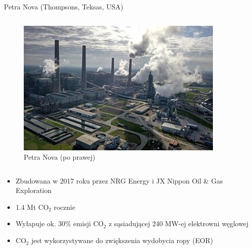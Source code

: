 \begin{columnframe}{Petra Nova (Thompsons, Teksas, USA)}
    \begin{column}{0.5\textwidth}
        \begin{figure}
            \centering
            \includegraphics[width=0.9\textwidth, frame]{images/petra_nova_plant.jpg}
            \caption{Petra Nova (po prawej)}
        \end{figure}
    \end{column}
    \begin{column}{0.5\textwidth}
        \begin{itemize}
            \item Zbudowana w 2017 roku przez NRG Energy i JX Nippon Oil \& Gas Exploration
            \item 1.4 Mt CO$_2$ rocznie
            \item Wyłapuje ok. 30\% emisji CO$_2$ z sąsiadującej 240 MW-ej elektrowni węglowej
            \item CO$_2$ jest wykorzystywane do zwiększenia wydobycia ropy (EOR)
        \end{itemize}
    \end{column}
\end{columnframe}

